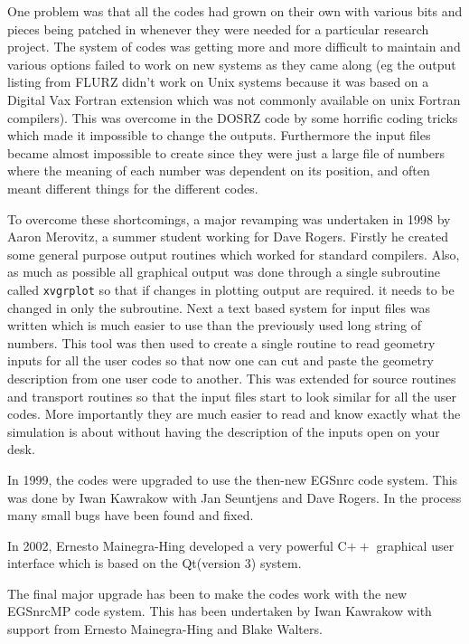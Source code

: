 \documentclass[12pt,twoside]{article}  %
\begin{document}
One problem was that
all the codes had grown on their own with various bits and pieces being
patched in whenever they were needed for a particular research project.
The system of codes was getting more and more difficult to maintain
and various options failed to work on new systems as they came along
(eg the output listing from FLURZ didn't work on Unix systems
because it was based on a
Digital Vax Fortran extension which was not commonly available on unix
Fortran compilers).  This was overcome in the DOSRZ code by some horrific
coding tricks which made it impossible to change the outputs.  Furthermore the
input files became almost impossible to create since they were just a
large file of numbers where the meaning of each number was dependent on
its position, and often meant different things for the different codes.

To overcome these shortcomings, a major revamping was undertaken in 1998
by Aaron Merovitz, a summer student working for Dave Rogers.  Firstly he
created some general purpose output routines which worked for standard
compilers. Also, as much as possible all graphical output was done through
a single subroutine called {\tt xvgrplot} so that if changes in plotting
output are required. it needs to be changed in only the subroutine.
Next a text based system for input files was written which is much easier
to use than the previously used long string of numbers.  This tool was
then used to create a single routine to read geometry inputs for all the
user codes so that now one can cut and paste the geometry description
from one user code to another. This was extended for source routines and
transport routines so that the input files start to look similar for all
the user codes.  More importantly they are much easier to read and know
exactly what the simulation is about without having the description of
the inputs open on your desk.   

In 1999, the codes were upgraded to use the then-new EGSnrc code system.
This was done by Iwan Kawrakow with Jan Seuntjens and Dave Rogers.
In the process many small bugs have been found and fixed.

In 2002, Ernesto Mainegra-Hing developed a very powerful C$++$ graphical
user interface which is based on the Qt(version 3) system\cite{Ma03}.

The final major upgrade has been to make the codes work with the new
EGSnrcMP code system. This has been undertaken by Iwan Kawrakow with
support from Ernesto Mainegra-Hing and Blake Walters.
\end{document}
